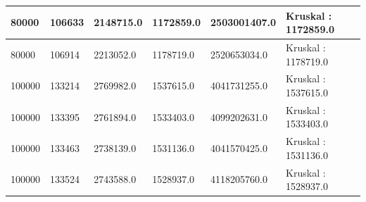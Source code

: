 \begin{longtable}[H]{|p{1.5cm}|p{1.5cm}|p{2cm}|p{2cm}|p{3cm}|p{3cm}|}
    80000 & 106633 & 2148715.0 & 1172859.0 & 2503001407.0 & Kruskal : 1172859.0 \\ \hline
    80000 & 106914 & 2213052.0 & 1178719.0 & 2520653034.0 & Kruskal : 1178719.0 \\ \hline
    100000 & 133214 & 2769982.0 & 1537615.0 & 4041731255.0 & Kruskal : 1537615.0 \\ \hline 
    100000 & 133395 & 2761894.0 & 1533403.0 & 4099202631.0 & Kruskal : 1533403.0 \\ \hline 
    100000 & 133463 & 2738139.0 & 1531136.0 & 4041570425.0 & Kruskal : 1531136.0 \\ \hline 
    100000 & 133524 & 2743588.0 & 1528937.0 & 4118205760.0 & Kruskal : 1528937.0 \\ \hline 
\end{longtable}









